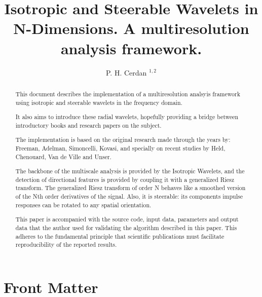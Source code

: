 \documentclass{InsightArticle}
\title{Isotropic and Steerable Wavelets in N-Dimensions. A multiresolution analysis framework.}
\author{P. H. Cerdan $^{1,2}$}
\theoremstyle{definition}
\newcommand{\IJhandlerIDnumber}{3558}
\begin{document}
%


\ifpdf
\else
\fi


\maketitle


\ifhtml
\chapter*{Front Matter\label{front}}
\fi

\begin{abstract}
\noindent
This document describes the implementation of a multiresolution analsyis framework using isotropic and steerable wavelets in the frequency domain.

It also aims to introduce these radial wavelets, hopefully providing a bridge between introductory books and research papers on the subject.

The implementation is based on the original research made through the years by: Freeman, Adelman, Simoncelli, Kovasi, and specially on recent studies by Held, Chenouard, Van de Ville and Unser.

The backbone of the multiscale analysis is provided by the Isotropic Wavelets, and the detection of directional features is provided by coupling it with a generalized Riesz transform.
The generalized Riesz transform of order N behaves like a smoothed version of the Nth order derivatives of the signal. Also, it is steerable: its components impulse responses can be rotated to any spatial orientation.

This paper is accompanied with the source code, input data, parameters and
output data that the author used for validating the algorithm described in
this paper. This adheres to the fundamental principle that scientific
publications must facilitate reproducibility of the reported results.

\end{abstract}
\end{document}
